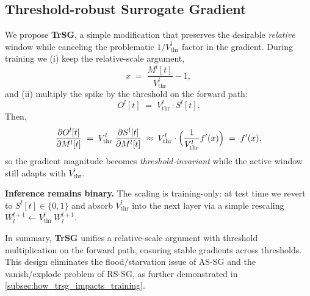 \subsection{Threshold-robust Surrogate Gradient}
\label{sec:ta_srgd}

We propose \textbf{TrSG}, a simple modification that preserves the desirable \emph{relative} window while canceling the problematic \(1/V^l_{\text{thr}}\) factor in the gradient. During training we (i) keep the relative-scale argument,
\[
x \;=\; \frac{M^l[t]}{V^l_{\text{thr}}} - 1,
\]
and (ii) multiply the spike by the threshold on the forward path:
\begin{equation}
\label{eq:ta_srgd_core}
O^l[t] \;=\; V^l_{\text{thr}}\cdot S^l[t].
\end{equation}
Then,
\begin{equation}
\label{eq:ta_srgd_chainrule}
\frac{\partial O^l[t]}{\partial M^l[t]}
\;=\;
V^l_{\text{thr}}\;\frac{\partial S^l[t]}{\partial M^l[t]}
\;\approx\;
V^l_{\text{thr}}\cdot
\Bigl(\frac{1}{V^l_{\text{thr}}} f'(x)\Bigr)
\;=\;
f'(x),
\end{equation}
so the gradient magnitude becomes \emph{threshold-invariant} while the active window still adapts with \(V^l_{\text{thr}}\). 

\textbf{Inference remains binary.} The scaling is training-only: at test time we revert to \(S^l[t]\in\{0,1\}\) and absorb \(V^l_{\text{thr}}\) into the next layer via a simple rescaling \(W^{l+1}_{l}\leftarrow V^l_{\text{thr}}\,W^{l+1}_{l}\). 

In summary, \textbf{TrSG} unifies a relative-scale argument with threshold multiplication on the forward path, ensuring stable gradients across thresholds. This design eliminates the flood/starvation issue of AS-SG and the vanish/explode problem of RS-SG, as further demonstrated in \cref{subsec:how_trsg_impacts_training}.
